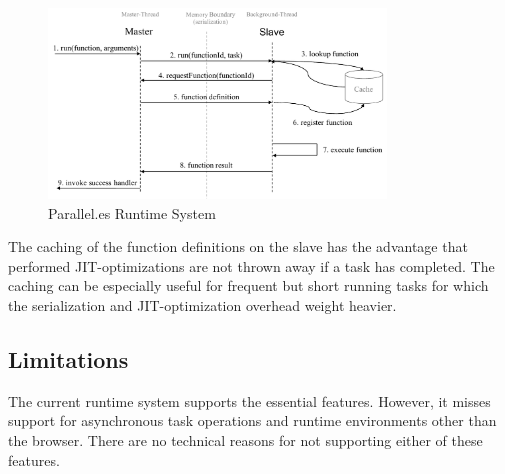 \begin{figure}
	\centering
	\includegraphics[width=0.8\textwidth]{runtime-system.pdf}

	\caption{Parallel.es Runtime System}
	\label{fig:runtime-system}
\end{figure}

The caching of the function definitions on the slave has the advantage that performed JIT-optimizations are not thrown away if a task has completed. The caching can be especially useful for frequent but short running tasks for which the serialization and JIT-optimization overhead weight heavier.


\subsection{Limitations}
The current runtime system supports the essential features. However, it misses support for asynchronous task operations and runtime environments other than the browser. There are no technical reasons for not supporting either of these features. 